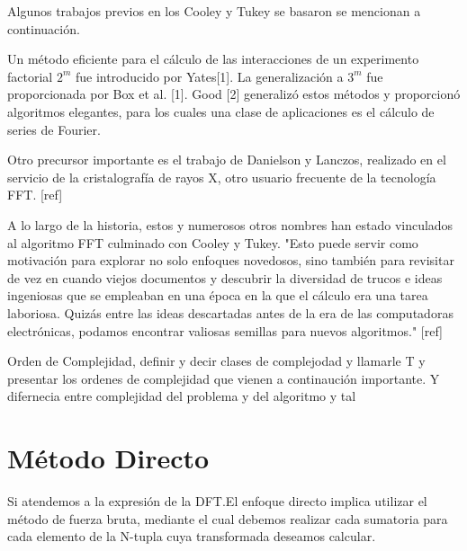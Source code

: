 \noindent Algunos trabajos previos en los Cooley y Tukey se basaron se mencionan a continuación.

\noindent Un método eficiente para el cálculo de las interacciones de un experimento factorial $2^m$ fue introducido por Yates[1]. La generalización a $3^m$ fue proporcionada por Box et al. [1]. Good [2] generalizó estos métodos y proporcionó algoritmos elegantes, para los cuales una clase de aplicaciones es el cálculo de series de Fourier.

\noindent Otro precursor importante es el trabajo de Danielson y Lanczos, realizado en el servicio de la cristalografía de rayos X, otro usuario frecuente de la tecnología FFT. [ref]

\noindent A lo largo de la historia, estos y numerosos otros nombres han estado vinculados al algoritmo FFT culminado con Cooley y Tukey.
"Esto puede servir como motivación para explorar no solo enfoques novedosos, sino también para revisitar de vez en cuando viejos documentos y descubrir la diversidad de trucos e ideas ingeniosas que se empleaban en una época en la que el cálculo era una tarea laboriosa. Quizás entre las ideas descartadas antes de la era de las computadoras electrónicas, podamos encontrar valiosas semillas para nuevos algoritmos." [ref]

\begin{definicion}
    Orden de Complejidad, definir y decir clases de complejodad y llamarle T y presentar los ordenes de complejidad que vienen a continaución importante.
    Y difernecia entre complejidad del problema y del algoritmo y tal
\end{definicion}


\section{Método Directo}
Si atendemos a la expresión de la DFT.El enfoque directo implica utilizar el método de fuerza bruta, mediante el cual debemos realizar cada sumatoria para cada elemento de la N-tupla cuya transformada deseamos calcular.

